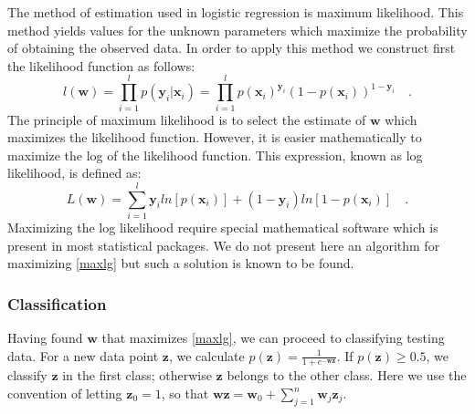 \documentclass[a4paper,11pt,oneside]{article}
\begin{document}
The method of estimation used in logistic regression is maximum likelihood. This method yields values for the unknown 
parameters which maximize the probability of obtaining the observed data. In order to apply this method we construct 
first the likelihood function as follows:
\begin{equation}
  l(\mathbf{w}) = \prod_{i=1}^l p(\mathbf{y}_i|\mathbf{x}_i) =  \prod_{i=1}^l p(\mathbf{x}_i)^{\mathbf{y}_i}(1-p(\mathbf{x}_i))^{1-\mathbf{y}_i}\quad .
\end{equation}
The principle of maximum likelihood is to select the estimate of $\mathbf{w}$ which maximizes the likelihood function.
However, it is easier mathematically to maximize the log of the likelihood function. This expression, known as log likelihood,
is defined as:
\begin{equation}\label{maxlg}
  L(\mathbf{w}) = \sum_{i=1}^l {\mathbf{y}_iln[p(\mathbf{x}_i)]+(1-\mathbf{y}_i)ln[1-p(\mathbf{x}_i)]}\quad .
\end{equation}
Maximizing the log likelihood require special mathematical software which is present in most statistical packages.
We do not present here an algorithm for maximizing \ref{maxlg} but such a solution is known to be found.
\subsubsection*{Classification}
Having found $\mathbf{w}$ that maximizes \ref{maxlg}, we can proceed to classifying testing data.
For a new data point $\mathbf{z}$, we calculate $p(\mathbf{z}) = \frac{1}{1+e^{-\mathbf{w}\mathbf{z}}}$.
If $p(\mathbf{z})\geq 0.5$, we classify $\mathbf{z}$ in the first class; otherwise $\mathbf{z}$ belongs to
the other class. Here we use the convention of letting $\mathbf{z}_0=1$, so that 
$\mathbf{wz} = \mathbf{w}_0 + \sum_{j=1}^n \mathbf{w}_j\mathbf{z}_j$.
\end{document}
